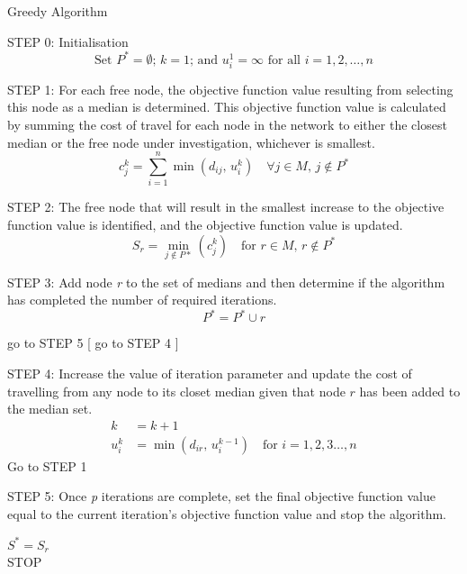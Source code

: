 \documentclass[11pt]{article}
\begin{document}
	\begin{algorithm}
	\caption{Greedy Algorithm}
	\begin{algorithmic}[0]
		
		\Statex
		\Statex STEP 0: Initialisation	
		\begin{equation*}
			\text{Set } P^{*} = \emptyset \text{; } k = 1\text{; and }u_i^1 = \infty\text{ for all } i=1,2,\dots,n
		\end{equation*}

		\Statex 
		\Statex STEP 1: For each free node, the objective function value resulting from selecting this node as a median is determined.  This objective function value is calculated by summing the cost of travel for each node in the network to either the closest median or the free node under investigation, whichever is smallest.
		\begin{equation*}
			c_j^k = \sum_{i=1}^{n}\min(d_{ij} \text{, } u_i^k) \quad \forall j \in M \text{, } j \notin P^*
		\end{equation*}

		\Statex 
		\Statex STEP 2: The free node that will result in the smallest increase to the objective function value is identified, and the objective function value is updated.
		\begin{equation*}
			S_r = \min_{j \notin P*}(c_j^k) \quad \text{for } r \in M \text{, } r \notin P^*
		\end{equation*}
		
		\Statex 
		\Statex STEP 3: Add node \emph{r} to the set of medians and then determine if the algorithm has completed the number of required iterations.
		\begin{equation*}
		P^* = P^* \cup r
		\end{equation*}
		
			\Statex go to STEP 5
		[
		\Else
			\Statex go to STEP 4
		]
		\EndIf
		
		\Statex 
		\Statex STEP 4: Increase the value of iteration parameter and update the cost of travelling from any node to its closet median given that node $r$ has been added to the median set.
		\begin{align*}
		k &= k+1\\
		u_i^k &= \min(d_{ir} \text{, } u_i^{k-1}) \quad \text{for } i = 1,2,3 \dots,n
		\end{align*}
		\Statex Go to STEP 1
		
		\Statex 
		\Statex STEP 5: Once \emph{p} iterations are complete, set the final objective function value equal to the current iteration's objective function value and stop the algorithm.
		\begin{center}
		$S^{*} = S_r$\\
		STOP
		\end{center}
		
		
	\end{algorithmic}
	\end{algorithm}
	
\end{document}
